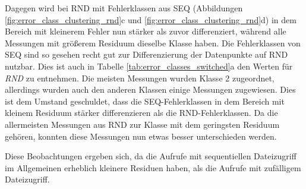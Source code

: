 \documentclass[
	12pt,
	a4paper,
	BCOR10mm,
	DIV14,
	listof=totoc,
	bibliography=totoc,
	headsepline
]{scrreprt}
\begin{document}
Dagegen wird bei RND mit Fehlerklassen aus SEQ (Abbildungen \ref{fig:error_class_clustering_rnd}c und \ref{fig:error_class_clustering_rnd}d) in dem Bereich mit kleinerem Fehler nun stärker als zuvor differenziert, während alle Messungen mit größerem Residuum dieselbe Klasse haben.
Die Fehlerklassen von SEQ sind so gesehen recht gut zur Differenzierung der Datenpunkte auf RND nutzbar.
Dies ist auch in Tabelle \ref{tab:error_classes_switched}a den Werten für \textit{RND} zu entnehmen. Die meisten Messungen wurden Klasse 2 zugeordnet, allerdings wurden auch den anderen Klassen einige Messungen zugewiesen.
Dies ist dem Umstand geschuldet, dass die SEQ-Fehlerklassen in dem Bereich mit kleinem Residuum stärker differenzieren als die RND-Fehlerklassen.
Da die allermeisten Messungen aus RND zur Klasse mit dem geringsten Residuum gehören, konnten diese Messungen nun etwas besser unterschieden werden.\medskip

Diese Beobachtungen ergeben sich, da die Aufrufe mit sequentiellen Dateizugriff im Allgemeinen erheblich kleinere Residuen haben, als die Aufrufe mit zufälligem Dateizugriff.
\end{document}
